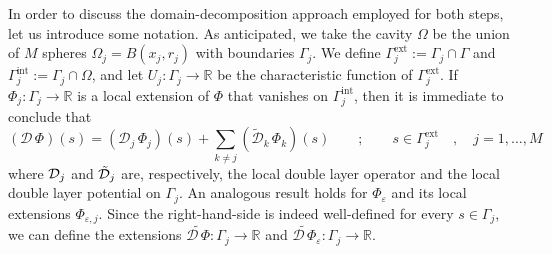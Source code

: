 In order to discuss the domain-decomposition approach employed for both steps, let us introduce some notation. As anticipated, we take the cavity $\Omega$ be the union of $M$ spheres $\Omega_j = B(x_j, r_j)$ with boundaries $\Gamma_j$. We define $\Gamma_j^\text{ext}:= \Gamma_j \cap \Gamma$ and $\Gamma_j^\text{int} := \Gamma_j \cap \Omega$, and let $U_j: \Gamma_j \to \mathbb{R}$ be the characteristic function of $\Gamma_j^\text{ext}$. If $\Phi_j : \Gamma_j \to \mathbb{R}$ is a local extension of $\Phi$ that vanishes on $\Gamma_j^\text{int}$, then it is immediate to conclude that
\begin{equation}\label{eq:16}
(\mathcal{D} \, \Phi ) (s) = ( \mathcal{D}_j \, \Phi_j )(s) + \sum_{k \ne j} (\tilde{\mathcal{D}}_k \, \Phi_k )(s) \qquad ; \qquad s \in \Gamma_j^\text{ext} \quad, \quad  j = 1 , \ldots , M
\end{equation}
where $\mathcal{D}_j$ and $\tilde{\mathcal{D}}_j$ are, respectively, the local double layer operator and the local double layer potential on $\Gamma_j$. An analogous result holds for $\Phi_\varepsilon$ and its local extensions $\Phi_{\varepsilon,j}$. Since the right-hand-side is indeed well-defined for every $s\in \Gamma_j$, we can define the extensions $\widetilde{\mathcal{D} \, \Phi} : \Gamma_j \to \mathbb{R}$ and $\widetilde{\mathcal{D} \, \Phi}_\varepsilon : \Gamma_j \to \mathbb{R}$.

